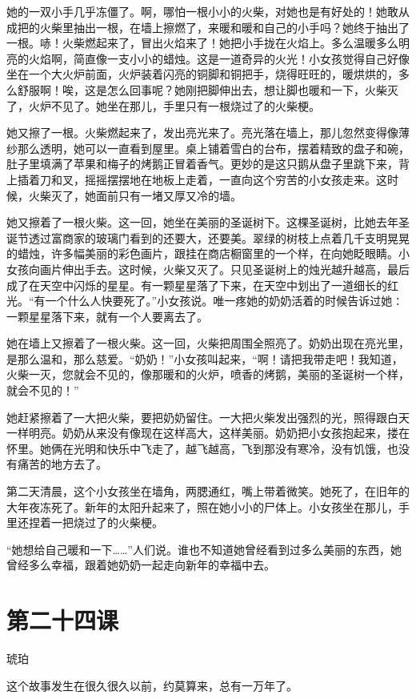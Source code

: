 \documentclass[12pt,UTF8]{ctexbook}
\begin{document}
她的一双小手几乎冻僵了。啊，哪怕一根小小的火柴，对她也是有好处的！她敢从成把的火柴里抽出一根，在墙上擦燃了，来暖和暖和自己的小手吗？她终于抽出了一根。哧！火柴燃起来了，冒出火焰来了！她把小手拢在火焰上。多么温暖多么明亮的火焰啊，简直像一支小小的蜡烛。这是一道奇异的火光！小女孩觉得自己好像坐在一个大火炉前面，火炉装着闪亮的铜脚和铜把手，烧得旺旺的，暖烘烘的，多么舒服啊！唉，这是怎么回事呢？她刚把脚伸出去，想让脚也暖和一下，火柴灭了，火炉不见了。她坐在那儿，手里只有一根烧过了的火柴梗。

她又擦了一根。火柴燃起来了，发出亮光来了。亮光落在墙上，那儿忽然变得像薄纱那么透明，她可以一直看到屋里。桌上铺着雪白的台布，摆着精致的盘子和碗，肚子里填满了苹果和梅子的烤鹅正冒着香气。更妙的是这只鹅从盘子里跳下来，背上插着刀和叉，摇摇摆摆地在地板上走着，一直向这个穷苦的小女孩走来。这时候，火柴灭了，她面前只有一堵又厚又冷的墙。

她又擦着了一根火柴。这一回，她坐在美丽的圣诞树下。这棵圣诞树，比她去年圣诞节透过富商家的玻璃门看到的还要大，还要美。翠绿的树枝上点着几千支明晃晃的蜡烛，许多幅美丽的彩色画片，跟挂在商店橱窗里的一个样，在向她眨眼睛。小女孩向画片伸出手去。这时候，火柴又灭了。只见圣诞树上的烛光越升越高，最后成了在天空中闪烁的星星。有一颗星星落了下来，在天空中划出了一道细长的红光。“有一个什么人快要死了。”小女孩说。唯一疼她的奶奶活着的时候告诉过她∶一颗星星落下来，就有一个人要离去了。

她在墙上又擦着了一根火柴。这一回，火柴把周围全照亮了。奶奶出现在亮光里，是那么温和，那么慈爱。“奶奶！”小女孩叫起来，“啊！请把我带走吧！我知道，火柴一灭，您就会不见的，像那暖和的火炉，喷香的烤鹅，美丽的圣诞树一个样，就会不见的！”

她赶紧擦着了一大把火柴，要把奶奶留住。一大把火柴发出强烈的光，照得跟白天一样明亮。奶奶从来没有像现在这样高大，这样美丽。奶奶把小女孩抱起来，搂在怀里。她俩在光明和快乐中飞走了，越飞越高，飞到那没有寒冷，没有饥饿，也没有痛苦的地方去了。

第二天清晨，这个小女孩坐在墙角，两腮通红，嘴上带着微笑。她死了，在旧年的大年夜冻死了。新年的太阳升起来了，照在她小小的尸体上。小女孩坐在那儿，手里还捏着一把烧过了的火柴梗。

“她想给自己暖和一下……”人们说。谁也不知道她曾经看到过多么美丽的东西，她曾经多么幸福，跟着她奶奶一起走向新年的幸福中去。

\section{第二十四课}

琥珀

这个故事发生在很久很久以前，约莫算来，总有一万年了。
\end{document}

